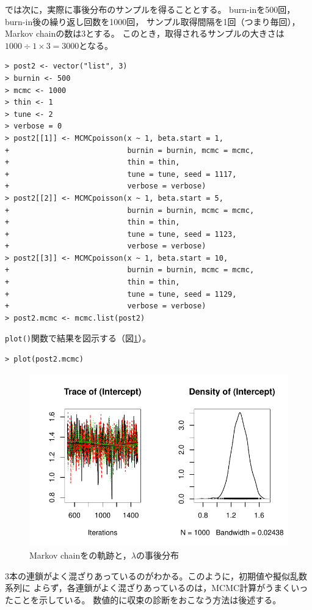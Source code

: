 \documentclass[11pt,uplatex]{jsarticle}
\begin{document}
では次に，実際に事後分布のサンプルを得ることとする。
burn-inを500回，burn-in後の繰り返し回数を1000回，
サンプル取得間隔を1回（つまり毎回），
Markov chainの数は3とする。
このとき，取得されるサンプルの大きさは$1000\div1\times3=3000$となる。

\begin{lstlisting}
> post2 <- vector("list", 3)
> burnin <- 500
> mcmc <- 1000
> thin <- 1
> tune <- 2
> verbose = 0
> post2[[1]] <- MCMCpoisson(x ~ 1, beta.start = 1,
+                           burnin = burnin, mcmc = mcmc,
+                           thin = thin,
+                           tune = tune, seed = 1117,
+                           verbose = verbose)
> post2[[2]] <- MCMCpoisson(x ~ 1, beta.start = 5,
+                           burnin = burnin, mcmc = mcmc,
+                           thin = thin,
+                           tune = tune, seed = 1123,
+                           verbose = verbose)
> post2[[3]] <- MCMCpoisson(x ~ 1, beta.start = 10,
+                           burnin = burnin, mcmc = mcmc,
+                           thin = thin,
+                           tune = tune, seed = 1129,
+                           verbose = verbose)
> post2.mcmc <- mcmc.list(post2)
\end{lstlisting}

\texttt{plot()}関数で結果を図示する（図\ref{MCMC_plot}）。
\begin{lstlisting}
> plot(post2.mcmc)
\end{lstlisting}

\begin{figure}[hbtp]
  \begin{center}
    \includegraphics[bb=0 0 360 240, clip, width=260 bp]{example1-3.pdf}
  \end{center}
  \caption{Markov chainをの軌跡と，$\lambda$の事後分布}
  \label{MCMC_plot}
\end{figure}

3本の連鎖がよく混ざりあっているのがわかる。このように，初期値や擬似乱数系列に
よらず，各連鎖がよく混ざりあっているのは，MCMC計算がうまくいったことを示している。
数値的に収束の診断をおこなう方法は後述する。
\end{document}
